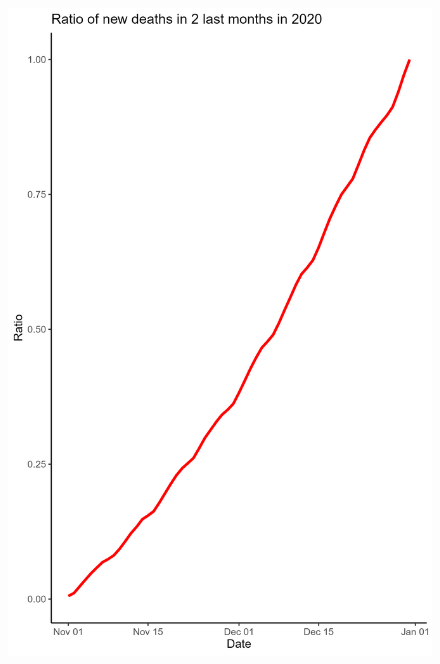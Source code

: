 \documentclass[a4paper]{article}
\theoremstyle{definition}
\begin{document}
\begin{enumerate}[i)]
\begin{enumerate}[1]
\begin{figure}[H]
				\includegraphics[scale=0.2]{images/7.6.1.png}
			\end{figure}
			\begin{figure}[H]
				\centering

\end{figure}
\end{enumerate}
\end{enumerate}
\end{document}
